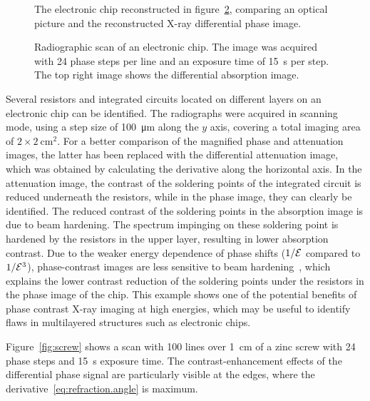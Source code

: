 \begin{figure}[htb]
\begin{subfigure}[b]{.49\textwidth}
    \caption{}
    \end{subfigure}
    \caption{The electronic chip reconstructed in figure~\ref{fig:img_chip},
comparing an optical picture and the reconstructed X-ray differential phase
image.}
    \label{fig:chip_photo}
\end{figure}

\begin{figure}[htp]
    \centering
    
    \caption{Radiographic scan of an electronic chip. The image was acquired
        with 24 phase steps per line and an exposure time of \SI{15}{\second} per
    step. The top right image shows the differential absorption image.}\label{fig:img_chip}
\end{figure}

Several resistors and integrated circuits located on different
layers on an electronic chip can be identified. The radiographs were acquired in scanning
mode, using a step size of \SI{100}{\micro\metre} along the $y$ axis, covering a total imaging
area of $2 \times \SI{2}{\centi\metre^2}$. For a better comparison of the magnified phase and
attenuation images, the latter has been replaced with the differential
attenuation image, which was obtained by calculating the derivative along
the horizontal axis. In the attenuation image, the contrast of the soldering
points of the integrated circuit is reduced underneath the resistors, while
in the phase image, they can clearly be identified. The reduced contrast of
the soldering points in the absorption image is due to beam hardening. The
spectrum impinging on these soldering point is hardened by the resistors in
the upper layer, resulting in lower absorption contrast. Due to the weaker
energy dependence of phase shifts ($1/\mathcal{E}$ compared to $1/\mathcal{E}^3$), phase-contrast
images are less sensitive to beam hardening~\parencite{Chabior2011a}, which explains the lower
contrast reduction of the soldering points under the resistors in the
phase image of the chip. This example shows one of the potential benefits of
phase contrast X-ray imaging at high energies, which may be useful to
identify flaws in multilayered structures such as electronic chips.

Figure~\ref{fig:screw} shows a scan with \num{100} lines over
\SI{1}{\centi\metre} of a zinc screw
with \num{24} phase steps and \SI{15}{\second} exposure time.
The contrast-enhancement effects of the differential phase signal are
particularly visible at the edges, where the
derivative~\eqref{eq:refraction.angle} is maximum.

